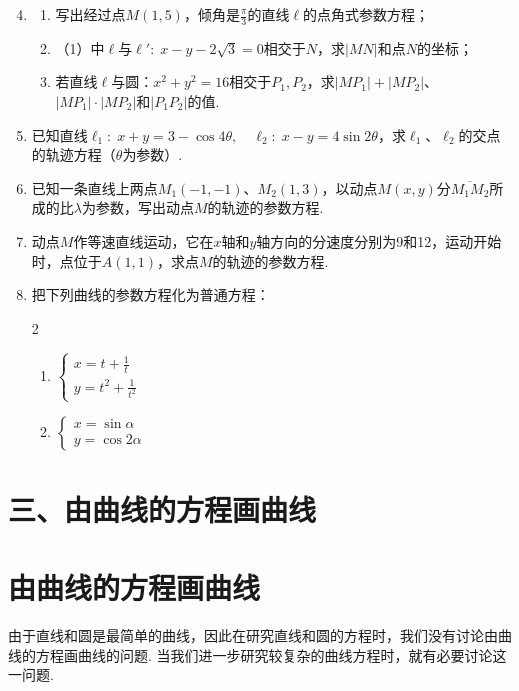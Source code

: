 \begin{enumerate}\setcounter{enumi}{3}
    \item \begin{enumerate}[(1)]
    \item 写出经过点$M(1,5)$，倾角是$\frac{\pi}{3}$的直线$\ell$的点角式参数方程；
    \item （1）中$\ell$与$\ell':\; x-y-2\sqrt{3}=0$相交于$N$，求$|MN|$和点$N$的坐标；
    \item  若直线$\ell$与圆：$x^2+y^2=16$相交于$P_1,P_2$，求$|MP_1|+|MP_2|$、$|MP_1|\cdot |MP_2|$和$|P_1P_2|$的值.      
    \end{enumerate}
    \item 已知直线$\ell_1:\;x+y=3-\cos4\theta,\quad \ell_2:\; x-y=4\sin2\theta$，求$\ell_1$、$\ell_2$的交点的轨迹方程（$\theta$为参数）.
    \item 已知一条直线上两点$M_1(-1,-1)$、$M_2(1,3)$，以动点$M(x,y)$分$\overline{M_1M_2}$所成的比$\lambda$为参数，写出动点$M$的轨迹的参数方程.
    \item 动点$M$作等速直线运动，它在$x$轴和$y$轴方向的分速度分别为9和12，运动开始时，点位于$A(1,1)$，求点$M$的轨迹的参数方程.
    \item 把下列曲线的参数方程化为普通方程：
\begin{multicols}{2}
\begin{enumerate}[(1)]
    \item $\begin{cases}
        x= t+\frac{1}{t}\\[1.5ex]
        y= t^2+\frac{1}{t^2} 
    \end{cases}$
    \item $\begin{cases}
        x= \sin\alpha\\
        y= \cos2\alpha
    \end{cases}$
\end{enumerate}
\end{multicols}
\end{enumerate}


\section*{三、由曲线的方程画曲线}
\section{由曲线的方程画曲线}
由于直线和圆是最简单的曲线，因此在研究直线和圆的方程时，我们没有讨论由曲线的方程画曲线的问题. 当我们进一步研究较复杂的曲线方程时，就有必要讨论这一问题.

